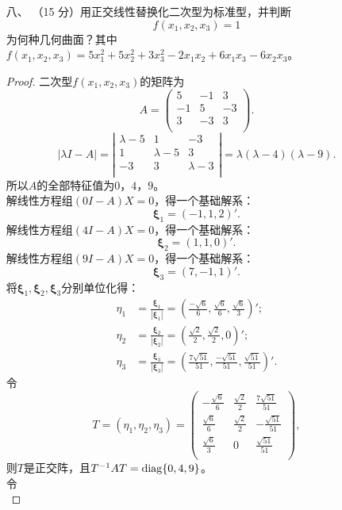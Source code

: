 \begin{enumerate}[1~]
\item[八、]
（15 分）用正交线性替换化二次型为标准型，并判断\[
f(x_1, x_2, x_3) = 1
\]
为何种几何曲面？其中 $f(x_1, x_2, x_3) = 5x^2_1 + 5x^2_2 + 3x^2_3 - 2x_1x_2 + 6x_1x_3 - 6x_2x_3$。
\begin{proof}
二次型$f(x_1, x_2, x_3)$的矩阵为\[A=
\left( \begin{matrix}
	5&		-1&		3\\
	-1&		5&		-3\\
	3&		-3&		3\\
\end{matrix} \right) .
\]
\[
|\lambda I-A|=\left| \begin{matrix}
	\lambda -5&		1&		-3\\
	1&		\lambda -5&		3\\
	-3&		3&		\lambda -3\\
\end{matrix} \right|=\lambda \left( \lambda -4 \right) \left( \lambda -9 \right) .
\]
所以$A$的全部特征值为$0$，$4$，$9$。\\
解线性方程组$(0I-A)X=0$，得一个基础解系：\[
\boldsymbol{\xi}_1=(-1, 1, 2)'.
\]
解线性方程组$(4I-A)X=0$，得一个基础解系：\[
\boldsymbol{\xi}_2=(1, 1, 0)'.
\]
解线性方程组$(9I-A)X=0$，得一个基础解系：\[
\boldsymbol{\xi}_3=(7, -1, 1)'.
\]
将$\boldsymbol{\xi}_1, \boldsymbol{\xi}_2, \boldsymbol{\xi}_3$分别单位化得：\begin{align*}
\eta_1&=\frac{\boldsymbol{\xi}_1}{|\boldsymbol{\xi}_1|}=\left(\frac{-\sqrt{6}}{6}, \frac{\sqrt{6}}{6}, \frac{\sqrt{6}}{3}\right)';\\
\eta_2&=\frac{\boldsymbol{\xi}_2}{|\boldsymbol{\xi}_2|}=\left(\frac{\sqrt{2}}{2}, \frac{\sqrt{2}}{2}, 0\right)';\\
\eta_3&=\frac{\boldsymbol{\xi}_3}{|\boldsymbol{\xi}_3|}=\left(\frac{7\sqrt{51}}{51}, \frac{-\sqrt{51}}{51}, \frac{\sqrt{51}}{51}\right)'.
\end{align*}
令\[
T=\left( \eta _1,\eta _2,\eta _3 \right) =\left( \begin{matrix}
	-\frac{\sqrt{6}}{6}&		\frac{\sqrt{2}}{2}&		\frac{7\sqrt{51}}{51}\\
	\frac{\sqrt{6}}{6}&		\frac{\sqrt{2}}{2}&		-\frac{\sqrt{51}}{51}\\
	\frac{\sqrt{6}}{3}&		0&		\frac{\sqrt{51}}{51}\\
\end{matrix} \right),
\]
则$T$是正交阵，且$T^{-1}AT={\rm diag}\{0, 4, 9\}$。\\
令\begin{equation}\label{transformation}

\end{equation}
\end{proof}
\end{enumerate}
